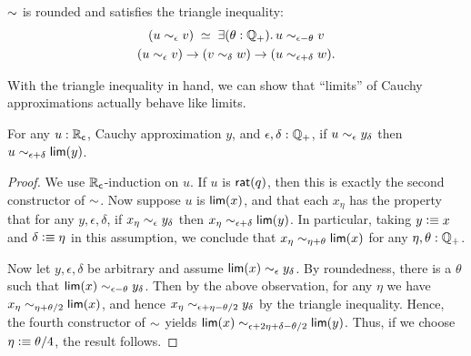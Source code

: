 \begin{cor}
  $\mathord\sim$ is rounded and satisfies the triangle inequality:
    \begin{gather}
      \eqvspaced{
        (u \close\epsilon v)
      }{
        \exis{\theta : \Qp} u \close{\epsilon - \theta} v
      }\\
      (u\close\epsilon v) \to (v\close\delta w) \to (u\close{\epsilon+\delta} w). \label{item:RC-sim-triangle}
    \end{gather}
\end{cor}

With the triangle inequality in hand, we can show that ``limits'' of Cauchy approximations actually behave like limits.

\begin{lem}\label{thm:RC-sim-lim}
  For any $u:\mathbb{R}_\mathsf{c}$, Cauchy approximation $y$, and $\epsilon,\delta:\mathbb{Q}_{+}$, if $u\sim_{\epsilon} y_\delta$ then $u\sim_{\epsilon+\delta} \mathsf{lim}(y)$.
\end{lem}
\begin{proof}
  We use $\mathbb{R}_\mathsf{c}$-induction on $u$.
  If $u$ is $\mathsf{rat}(q)$, then this is exactly the second constructor of $\mathord\sim$.
  Now suppose $u$ is $\mathsf{lim}(x)$, and that each $x_\eta$ has the property that for any $y,\epsilon,\delta$, if $x_\eta\sim_{\epsilon} y_\delta$ then $x_\eta \sim_{\epsilon+\delta} \mathsf{lim}(y)$.
  In particular, taking $y\vcentcolon\equiv x$ and $\delta\vcentcolon\equiv\eta$ in this assumption, we conclude that $x_\eta \sim_{\eta+\theta} \mathsf{lim}(x)$ for any $\eta,\theta:\mathbb{Q}_{+}$.

  Now let $y,\epsilon,\delta$ be arbitrary and assume $\mathsf{lim}(x) \sim_{\epsilon} y_\delta$.
  By roundedness, there is a $\theta$ such that $\mathsf{lim}(x) \sim_{\epsilon-\theta} y_\delta$.
  Then by the above observation, for any $\eta$ we have $x_\eta \sim_{\eta+\theta/2} \mathsf{lim}(x)$, and hence $x_\eta \sim_{\epsilon+\eta-\theta/2} y_\delta$ by the triangle inequality.
  Hence, the fourth constructor of $\mathord\sim$ yields $\mathsf{lim}(x) \sim_{\epsilon+2\eta+\delta-\theta/2} \mathsf{lim}(y)$.
  Thus, if we choose $\eta \vcentcolon\equiv \theta/4$, the result follows.
\end{proof}

